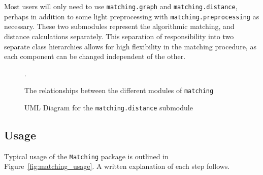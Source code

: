 \documentclass[11pt]{extarticle}
\begin{document}
Most users will only need to use \texttt{matching.graph} and \texttt{matching.distance}, perhaps in addition to some light preprocessing with \texttt{matching.preprocessing} as necessary.
These two submodules represent the algorithmic matching, and distance calculations separately.
This separation of responsibility into two separate class hierarchies allows for high flexibility in the matching procedure, as each component can be changed independent of the other.

\begin{figure}[h!]
  \caption{\label{fig:arch_flow} The relationships between the different modules of \texttt{matching}}.
\end{figure}
\begin{figure}[h!]
  \caption{\label{fig:distance_uml} UML Diagram for the \texttt{matching.distance} submodule}
\end{figure}

\newpage
\subsection{Usage}
\label{subsec:usage}

Typical usage of the \texttt{Matching} package is outlined in Figure~\ref{fig:matching_usage}. A written explanation of each step follows.
\end{document}

